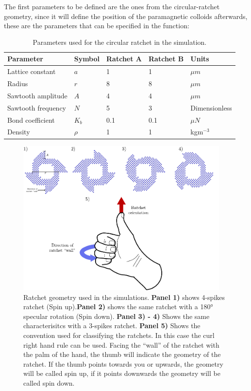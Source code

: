 The first parameters to be defined are the ones from the circular-ratchet geometry, since it will define the position of the paramagnetic colloids afterwards, these are the parameters that can be specified in the function:

\begin{table}[H]
\centering
\caption[Ratchet physical parameters.]{Parameters used for the circular ratchet in the simulation.}
\begin{tabular}{l l l l l}
\hline
Parameter & Symbol & Ratchet A & Ratchet B & Units \\
\hline
Lattice constant & \(a\) & 1 & 1 & \(\mu m\) \\
Radius & \( r\) & 8 & 8 & \( \mu m\) \\
Sawtooth amplitude & \( A\) & 4 & 4 & \( \mu m\) \\
Sawtooth frequency & \( N\) & 5 & 3 & Dimensionless\\
Bond coefficient & \( K_b\) & 0.1 & 0.1 & \( \mu N\) \\ 
Density & \(\rho\) & 1 & 1 & kgm\(^{-3}\) \\
\hline
\end{tabular}
\end{table}

\begin{figure}
  \begin{center}
    \includegraphics[width=0.95\textwidth]{figures/ratchet.pdf}
  \end{center}
  \caption[Ratchet geomety.]{Ratchet geometry used in the simulations. \textbf{Panel 1)} shows 4-spikes ratchet (Spin up).\textbf{Panel 2)} shows the same ratchet with a 180° specular rotation (Spin down). \textbf{Panel 3) - 4)} Shows the same characterisitcs with a 3-spikes ratchet. \textbf{ Panel 5)} Shows the convention used for classifying the ratchets. In this case the curl right hand rule can be used. Facing the ``wall'' of the ratchet with the palm of the hand, the thumb will indicate the geometry of the ratchet. If the thumb points towards you or upwards, the geometry will be called spin up, if it points downwards the geometry will be called spin down.}\label{fig:ratchetgeometry}
\end{figure}


